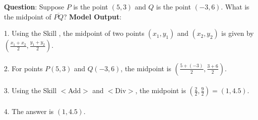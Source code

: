 \documentclass{article} %
\begin{document}
\begin{tcolorbox}[title = {MATH}, colback = Apricot!25!white, colframe = BrickRed!75!black] 
\textbf{Question}: Suppose $P$ is the point $(5,3)$ and $Q$ is the point $(-3,6)$. What is the midpoint of $\overline{PQ}$?
\tcblower
\textbf{Model Output}:


\quad


1. Using the Skill , the midpoint of two points $(x_1, y_1)$ and $(x_2, y_2)$ is given  by $\left(\frac{x_1+x_2}{2}, \frac{y_1+y_2}{2}\right)$. \\ \\
2. For points $P(5,3)$ and $Q(-3,6)$, the midpoint is $\left(\frac{5+(-3)}{2}, \frac{3+6}{2}\right)$. \\ \\
3. Using the Skill $<$Add$>$ and $<$Div$>$, the midpoint is $\left(\frac{2}{2}, \frac{9}{2}\right) = (1, 4.5)$. \\ \\
4. The answer is $(1, 4.5)$. \\
\end{tcolorbox}
\noindent\begin{minipage}{\textwidth}
 \label{Tab:example_compose_math_skill_3}
\end{minipage}


\newpage
\end{document}
